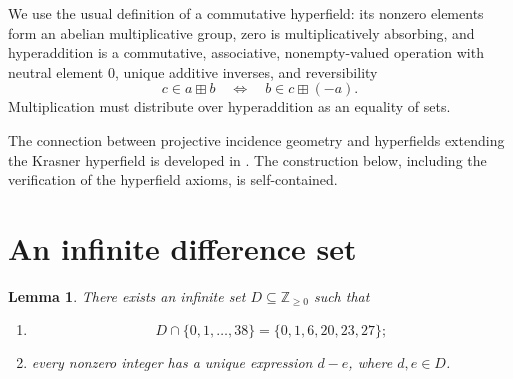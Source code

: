 \documentclass[11pt]{article}
\newcommand{\ZZ}{\mathbb{Z}}
\newtheorem{lemma}[theorem]{Lemma}
\begin{document}
We use the usual definition of a commutative hyperfield: its nonzero elements
form an abelian multiplicative group, zero is multiplicatively absorbing,
and hyperaddition is a commutative, associative, nonempty-valued operation
with neutral element \(0\), unique additive inverses, and reversibility
\[
    c\in a\boxplus b
    \quad\Longleftrightarrow\quad
    b\in c\boxplus(-a).
\]
Multiplication must distribute over hyperaddition as an equality of sets.

The connection between projective incidence geometry and hyperfields
extending the Krasner hyperfield is developed in
\cite[Sections~3--4]{CC}. The construction below, including the verification
of the hyperfield axioms, is self-contained.

\section{An infinite difference set}

\begin{lemma}\label{lem:difference-set}
There exists an infinite set \(D\subseteq\ZZ_{\geq 0}\) such that
\begin{enumerate}
    \item
    \[
        D\cap\{0,1,\ldots,38\}=\{0,1,6,20,23,27\};
    \]
    \item every nonzero integer has a unique expression \(d-e\), where
    \(d,e\in D\).
\end{enumerate}
\end{lemma}
\end{document}
